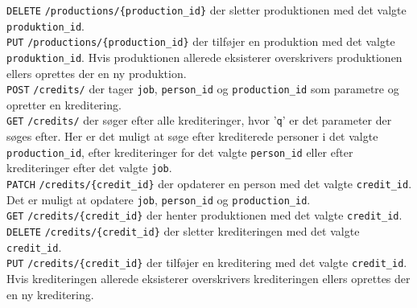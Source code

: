 \texttt{DELETE} \texttt{/productions/\{production\_id\}} der sletter produktionen med det valgte \texttt{produktion\_id}.\\


\texttt{PUT} \texttt{/productions/\{production\_id\}} der tilføjer en produktion med det valgte \texttt{produktion\_id}. Hvis produktionen allerede eksisterer overskrivers produktionen ellers oprettes der en ny produktion.\\


\texttt{POST} \texttt{/credits/} der tager \texttt{job}, \texttt{person\_id} og \texttt{production\_id} som parametre og opretter en kreditering.\\


\texttt{GET} \texttt{/credits/} der søger efter alle krediteringer, hvor '\texttt{q}' er det parameter der søges efter. Her er det muligt at søge efter krediterede personer i det valgte \texttt{production\_id}, efter krediteringer for det valgte \texttt{person\_id} eller efter krediteringer efter det valgte \texttt{job}.\\


\texttt{PATCH} \texttt{/credits/\{credit\_id\}} der opdaterer en person med det valgte \texttt{credit\_id}. Det er muligt at opdatere \texttt{job}, \texttt{person\_id} og \texttt{production\_id}.\\


\texttt{GET} \texttt{/credits/\{credit\_id\}} der henter produktionen med det valgte \texttt{credit\_id}.\\


\texttt{DELETE} \texttt{/credits/\{credit\_id\}} der sletter krediteringen med det valgte \texttt{credit\_id}.\\


\texttt{PUT} \texttt{/credits/\{credit\_id\}} der tilføjer en kreditering med det valgte \texttt{credit\_id}. Hvis krediteringen allerede eksisterer overskrivers krediteringen ellers oprettes der en ny kreditering.\\